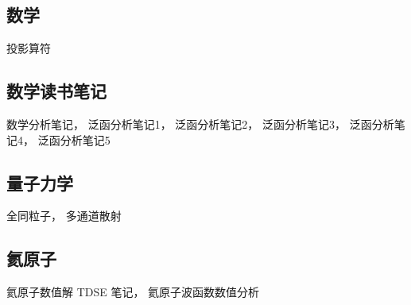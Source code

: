 
\subsection{数学}
投影算符

\subsection{数学读书笔记}
数学分析笔记， 泛函分析笔记1， 泛函分析笔记2， 泛函分析笔记3， 泛函分析笔记4， 泛函分析笔记5

\subsection{量子力学}
全同粒子， 多通道散射

\subsection{氦原子}
氦原子数值解 TDSE 笔记， 氦原子波函数数值分析
